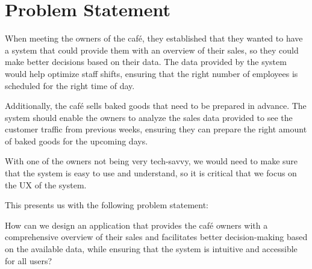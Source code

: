 \section{Problem Statement}\label{sec:problem-statement}

When meeting the owners of the café, they established that they wanted to have a system that could provide them with
an overview of their sales, so they could make better decisions based on their data.
The data provided by the system would help optimize staff shifts, ensuring that the right number of employees is
scheduled for the right time of day.

Additionally, the café sells baked goods that need to be prepared in advance.
The system should enable the owners to analyze the sales data provided to see the customer traffic from previous weeks,
ensuring they can prepare the right amount of baked goods for the upcoming days.

With one of the owners not being very tech-savvy, we would need to make sure that the system is easy to use and
understand, so it is critical that we focus on the UX of the system.

This presents us with the following problem statement:
\begin{tcolorbox}[title=Problem statement]
    How can we design an application that provides the café owners with a comprehensive overview of their sales and
    facilitates better decision-making based on the available data, while ensuring that the system is intuitive and
    accessible for all users?
\end{tcolorbox}
